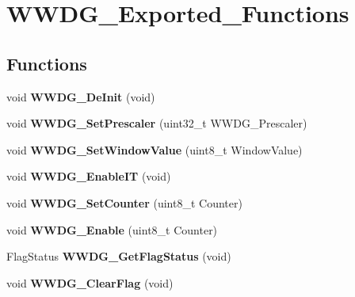 \hypertarget{group__WWDG__Exported__Functions}{
\section{WWDG\_\-Exported\_\-Functions}
\label{group__WWDG__Exported__Functions}
}
\subsection*{Functions}
\begin{DoxyCompactItemize}
\item 
\hypertarget{group__WWDG__Exported__Functions_ga7130f4dc861b9234b62e73f9f57f89a1}{
void {\bfseries WWDG\_\-DeInit} (void)}
\label{group__WWDG__Exported__Functions_ga7130f4dc861b9234b62e73f9f57f89a1}

\item 
\hypertarget{group__WWDG__Exported__Functions_gafeaa2b52c31ba7baca7eb61d2d42e07b}{
void {\bfseries WWDG\_\-SetPrescaler} (uint32\_\-t WWDG\_\-Prescaler)}
\label{group__WWDG__Exported__Functions_gafeaa2b52c31ba7baca7eb61d2d42e07b}

\item 
\hypertarget{group__WWDG__Exported__Functions_gaf44a7bf8bf6b11b41cd89ff521fdd5a5}{
void {\bfseries WWDG\_\-SetWindowValue} (uint8\_\-t WindowValue)}
\label{group__WWDG__Exported__Functions_gaf44a7bf8bf6b11b41cd89ff521fdd5a5}

\item 
\hypertarget{group__WWDG__Exported__Functions_gac8af66ea5254d3d78b60b9b7c7f29521}{
void {\bfseries WWDG\_\-EnableIT} (void)}
\label{group__WWDG__Exported__Functions_gac8af66ea5254d3d78b60b9b7c7f29521}

\item 
\hypertarget{group__WWDG__Exported__Functions_ga6e44cc35f133b28b9ad861f459bf8d76}{
void {\bfseries WWDG\_\-SetCounter} (uint8\_\-t Counter)}
\label{group__WWDG__Exported__Functions_ga6e44cc35f133b28b9ad861f459bf8d76}

\item 
\hypertarget{group__WWDG__Exported__Functions_ga10dc2554d0b504b5472e3ecf0f02a9e6}{
void {\bfseries WWDG\_\-Enable} (uint8\_\-t Counter)}
\label{group__WWDG__Exported__Functions_ga10dc2554d0b504b5472e3ecf0f02a9e6}

\item 
\hypertarget{group__WWDG__Exported__Functions_ga7df4882d45918b9b8249dfca1e44fabc}{
FlagStatus {\bfseries WWDG\_\-GetFlagStatus} (void)}
\label{group__WWDG__Exported__Functions_ga7df4882d45918b9b8249dfca1e44fabc}

\item 
\hypertarget{group__WWDG__Exported__Functions_gabd2b5a6317c2e1a3ab0795838ce59dd2}{
void {\bfseries WWDG\_\-ClearFlag} (void)}
\label{group__WWDG__Exported__Functions_gabd2b5a6317c2e1a3ab0795838ce59dd2}

\end{DoxyCompactItemize}
